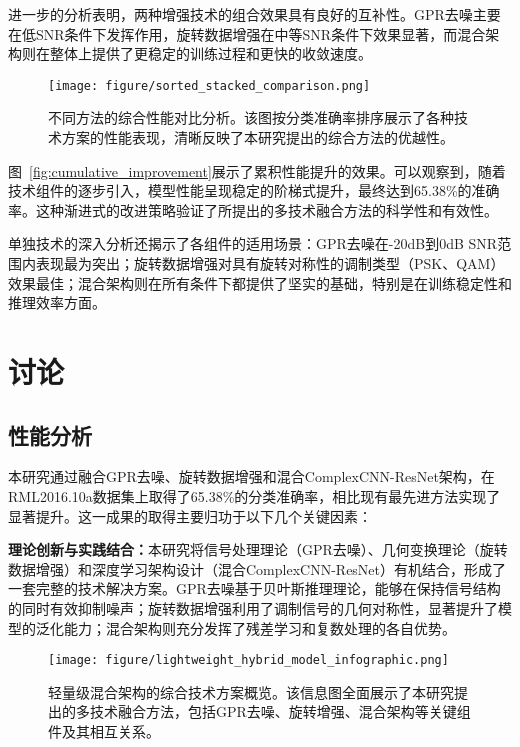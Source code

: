 \documentclass[conference]{IEEEtran}
\begin{document}
进一步的分析表明，两种增强技术的组合效果具有良好的互补性。GPR去噪主要在低SNR条件下发挥作用，旋转数据增强在中等SNR条件下效果显著，而混合架构则在整体上提供了更稳定的训练过程和更快的收敛速度。

\begin{figure}[htbp]
\centering
\texttt{[image: figure/sorted\_stacked\_comparison.png]}
\caption{不同方法的综合性能对比分析。该图按分类准确率排序展示了各种技术方案的性能表现，清晰反映了本研究提出的综合方法的优越性。}
\label{fig:method_comparison}
\end{figure}

图~\ref{fig:cumulative_improvement}展示了累积性能提升的效果。可以观察到，随着技术组件的逐步引入，模型性能呈现稳定的阶梯式提升，最终达到65.38\%的准确率。这种渐进式的改进策略验证了所提出的多技术融合方法的科学性和有效性。

单独技术的深入分析还揭示了各组件的适用场景：GPR去噪在-20dB到0dB SNR范围内表现最为突出；旋转数据增强对具有旋转对称性的调制类型（PSK、QAM）效果最佳；混合架构则在所有条件下都提供了坚实的基础，特别是在训练稳定性和推理效率方面。

\section{讨论}

\subsection{性能分析}

本研究通过融合GPR去噪、旋转数据增强和混合ComplexCNN-ResNet架构，在RML2016.10a数据集上取得了65.38\%的分类准确率，相比现有最先进方法实现了显著提升。这一成果的取得主要归功于以下几个关键因素：

\textbf{理论创新与实践结合：}本研究将信号处理理论（GPR去噪）、几何变换理论（旋转数据增强）和深度学习架构设计（混合ComplexCNN-ResNet）有机结合，形成了一套完整的技术解决方案。GPR去噪基于贝叶斯推理理论，能够在保持信号结构的同时有效抑制噪声；旋转数据增强利用了调制信号的几何对称性，显著提升了模型的泛化能力；混合架构则充分发挥了残差学习和复数处理的各自优势。

\begin{figure}[htbp]
\centering
\texttt{[image: figure/lightweight\_hybrid\_model\_infographic.png]}
\caption{轻量级混合架构的综合技术方案概览。该信息图全面展示了本研究提出的多技术融合方法，包括GPR去噪、旋转增强、混合架构等关键组件及其相互关系。}
\label{fig:comprehensive_overview}
\end{figure}
\end{document}
